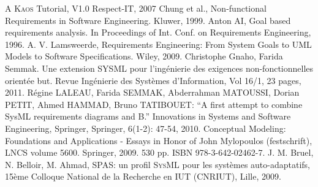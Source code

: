 \documentclass[10pt, conference, compsocconf]{IEEEtran}
\def\sysml{\textsc{SysML}}
\def\kaos{\textsc{Kaos}}
\begin{document}
\begin{thebibliography}{1}
A \kaos{} Tutorial, V1.0  Respect-IT, 2007
Chung et al., Non-functional Requirements in Software Engineering. Kluwer, 1999.
Anton AI, Goal based requirements analysis. In Proceedings of Int. Conf. on Requirements Engineering, 1996.
A. V. Lamsweerde, Requirements Engineering: From System Goals to UML Models to Software Specifications. Wiley, 2009.
 Christophe Gnaho, Farida Semmak. Une extension SYSML pour l'ing\'enierie des exigences non-fonctionnelles orient\'ee but. Revue Ing\'enierie des Syst\`emes d'Information, Vol 16/1, 23 pages, 2011.
R\'egine LALEAU, Farida SEMMAK, Abderrahman MATOUSSI, Dorian PETIT, Ahmed HAMMAD, Bruno TATIBOUET: ``A first attempt to combine SysML requirements diagrams and B.'' Innovations in Systems and Software Engineering, Springer, Springer, 6(1-2): 47-54, 2010.
Conceptual Modeling: Foundations and Applications - Essays in Honor of John Mylopoulos (festschrift), LNCS volume 5600. Springer, 2009.  530 pp. ISBN 978-3-642-02462-7.
J. M. Bruel, N. Belloir, M. Ahmad, SPAS: un profil \sysml{} pour les syst\`emes auto-adaptatifs, 15\`eme Colloque National de la Recherche en IUT (CNRIUT), Lille, 2009.

\end{thebibliography}




\end{document}

